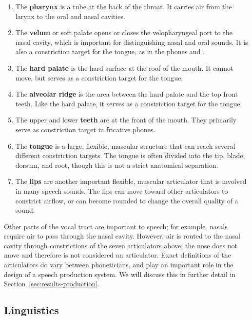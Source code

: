 \begin{enumerate}
\item The \textbf{pharynx} is a tube at the back of the throat.
  It carries air from the larynx to the oral and nasal cavities.
\item The \textbf{velum} or soft palate opens or closes
  the velopharyngeal port to the nasal cavity,
  which is important for distinguishing
  nasal and oral sounds.
  It is also a constriction target
  for the tongue, as in the phones \ipa{[k]} and \ipa{[g]}.
\item The \textbf{hard palate} is the hard surface
  at the roof of the mouth. It cannot move, but serves
  as a constriction target for the tongue.
\item The \textbf{alveolar ridge} is the area between
  the hard palate and the top front teeth. Like the hard palate,
  it serves as a constriction target for the tongue.
\item The upper and lower \textbf{teeth} are at the front of the mouth.
  They primarily serve as constriction target in fricative phones.
\item The \textbf{tongue} is a large, flexible, muscular structure
  that can reach several different constriction targets.
  The tongue is often divided into the tip, blade, dorsum, and root,
  though this is not a strict anatomical separation.
\item The \textbf{lips} are another important flexible, muscular
  articulator that is involved in many speech sounds.
  The lips can move toward other articulators to constrict airflow,
  or can become rounded to change the overall quality of a sound.
\end{enumerate}

Other parts of the vocal tract are important to speech;
for example, nasals require air
to pass through the nasal cavity.
However, air is routed to the nasal cavity
through constrictions of the seven articulators above;
the nose does not move and therefore is not
considered an articulator.
Exact definitions of the articulators
do vary between phoneticians,
and play an important role
in the design of a speech production system.
We will discuss this in further detail
in Section~\ref{sec:results-production}.

\subsection{Linguistics}
\label{sec:prod-linguistics}

